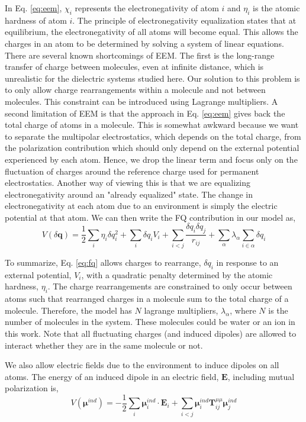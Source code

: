 \documentclass[journal=jacsat,manuscript=article]{achemso}
\begin{document}
In Eq. \ref{eq:eem}, $\chi_i$ represents the electronegativity of atom $i$ and
$\eta_i$ is the atomic hardness of atom $i$. The principle of electronegativity
equalization states that  at equilibrium, the electronegativity of all atoms
will become equal. This allows the charges in an atom to be determined by solving
a system of linear equations. There are several known shortcomings of EEM. The first
is the long-range transfer of charge between molecules, even at infinite distance,
which is unrealistic for the dielectric systems studied here.\cite{chen2007qtpie,chen2008unified}
Our solution to this problem is to only allow charge rearrangements within
a molecule and not between molecules. This constraint can be introduced using
Lagrange multipliers. A second limitation of EEM is that the approach in Eq. \ref{eq:eem}
gives back the total charge of atoms in a molecule. This is somewhat awkward because
we want to separate the multipolar electrostatics, which depends on the total charge,
from the polarization contribution which should only depend on the external potential
experienced by each atom. Hence, we drop the linear term and focus only on the
fluctuation of charges around the reference charge used for permanent electrostatics.
Another way of viewing this is that we are equalizing electronegativity around an "already
equalized" state. The change in electronegativity at each atom due to an environment is simply
the electric potential at that atom. We can then write the FQ contribution in our
model as,
\begin{equation}
  V(\delta \bm{q})=\frac12\sum_i \eta_i \delta q_i^2 + \sum_i \delta q_i V_i + \sum_{i<j}\frac{\delta q_i \delta q_j}{r_{ij}} + \sum_{\alpha}\lambda_\alpha \sum_{i\in\alpha}\delta q_{i}
  \label{eq:fq}
\end{equation}

To summarize, Eq. \ref{eq:fq} allows charges to rearrange, $\delta q_i$ in response to an external
potential, $V_i$, with a quadratic penalty determined by the atomic hardness, $\eta_i$.
The charge rearrangements are constrained to only occur between atoms such that rearranged
charges in a molecule sum to the total charge of a molecule. Therefore, the model has $N$ lagrange
multipliers, $\lambda_\alpha$, where $N$ is the number of molecules in the system. These molecules
could be water or an ion in this work. Note that all fluctuating charges (and induced
dipoles) are allowed to interact whether they are in the same molecule or not.

We also allow electric fields due to the environment to induce dipoles on all atoms.
The energy of an induced dipole in an electric field, $\bm{E}$, including mutual polarization is,
\begin{equation}
  V(\bm{\mu}^{ind})=-\frac12\sum_i \bm{\mu}_i^{ind}\cdot \bm{E}_i + \sum_{i<j}\bm{\mu}^{ind}_i \bm{T}^{\mu\mu}_{ij}\bm{\mu}^{ind}_j
  \label{eq:induced_dipoles}
\end{equation}
\end{document}
